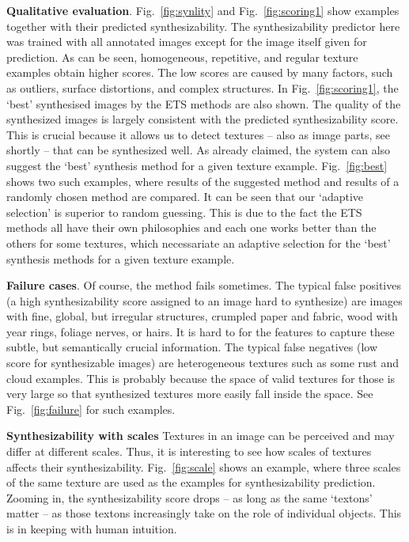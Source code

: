 \textbf{Qualitative evaluation}. 
Fig.~\ref{fig:synlity} and
Fig.~\ref{fig:scoring1} show examples together with their predicted
synthesizability. The synthesizability predictor here was trained
with all annotated images except for the image itself given for prediction.
As can be seen, homogeneous, repetitive, and regular texture examples
obtain higher scores. The low scores are caused by many factors, such
as outliers, surface distortions, and complex structures. In
Fig.~\ref{fig:scoring1}, the `best' synthesised images by the ETS
methods are also shown.  The quality of the synthesized images is
largely consistent with the predicted synthesizability score. This is
crucial because it allows us to detect textures -- also as image
parts, see shortly -- that can be synthesized well.  As already
claimed, the system can also suggest the `best' synthesis method for a
given texture example. Fig.~\ref{fig:best} shows two such examples,
where results of the suggested method and results of a randomly chosen
method are compared.  It can be seen that our `adaptive selection' is
superior to random guessing. This is due to the fact the ETS methods
all have their own philosophies and each one works better than the
others for some textures, which necessariate an adaptive
selection for the `best' synthesis methods for a given texture example.



\textbf{Failure cases}. Of course, the method fails sometimes.  The
typical false positives (a high synthesizability score assigned to an
image hard to synthesize) are images with fine, global, but irregular
structures, \eg crumpled paper and fabric, wood with year rings,
foliage nerves, or hairs.  It is hard to for the features to capture
these subtle, but semantically crucial information. The typical false
negatives (low score for synthesizable images) are heterogeneous
textures such as some rust and cloud examples.  This is probably
because the space of valid textures for those is very large so that
synthesized textures more easily fall inside the space. See
Fig.~\ref{fig:failure} for such examples.

\textbf{Synthesizability with scales} Textures in an image can be
perceived and may differ at different scales. Thus, it is interesting
to see how scales of textures affects their
synthesizability. Fig.~\ref{fig:scale} shows an example, where three
scales of the same texture are used as the examples for
synthesizability prediction. Zooming in, the synthesizability score
drops -- as long as the same `textons' matter -- as those textons 
increasingly take on the role of individual objects. This is in keeping with
human intuition. 




